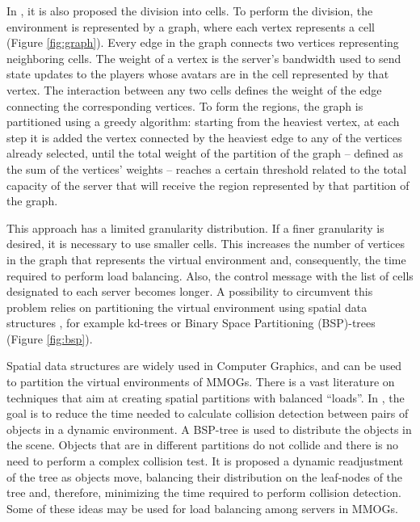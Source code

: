 \documentclass[acmjacm]{acmtrans2m}
\newcommand{\figurecaption}{Figure}
\begin{document}
In \cite{bezerra2009lbs}, it is also proposed the division into cells. To perform the division, the environment is represented by a graph, where each vertex represents a cell (\figurecaption{} \ref{fig:graph}). Every edge in the graph connects two vertices representing neighboring cells. The weight of a vertex is the server's bandwidth used to send state updates to the players whose avatars are in the cell represented by that vertex. The interaction between any two cells defines the weight of the edge connecting the corresponding vertices. To form the regions, the graph is partitioned using a greedy algorithm: starting from the heaviest vertex, at each step it is added the vertex connected by the heaviest edge to any of the vertices already selected, until the total weight of the partition of the graph -- defined as the sum of the vertices' weights -- reaches a certain threshold related to the total capacity of the server that will receive the region represented by that partition of the graph.

This approach has a limited granularity distribution. If a finer granularity is desired, it is necessary to use smaller cells. This increases the number of vertices in the graph that represents the virtual environment and, consequently, the time required to perform load balancing. Also, the control message with the list of cells designated to each server becomes longer. A possibility to circumvent this problem relies on partitioning the virtual environment using spatial data structures \cite{bentley1975mbs}, for example kd-trees or Binary Space Partitioning (BSP)-trees  
 (\figurecaption{} \ref{fig:bsp}).

Spatial data structures are widely used in Computer Graphics, and can be used to partition the virtual environments of MMOGs. There is a vast literature on techniques that aim at creating spatial partitions with balanced ``loads''. In \cite{luque2005bpc}, the goal is to reduce the time needed to calculate collision detection between pairs of objects in a dynamic environment. A BSP-tree is used to distribute the objects in the scene. Objects that are in different partitions do not collide and there is no need to perform a complex collision test. It is proposed a dynamic readjustment of the tree as objects move, balancing their distribution on the leaf-nodes of the tree and, therefore, minimizing the time required to perform collision detection. Some of these ideas may be used for load balancing among servers in MMOGs.%
\end{document}
